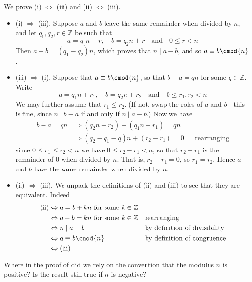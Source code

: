 \begin{cproof}
We prove (i) $\Leftrightarrow$ (iii) and (ii) $\Leftrightarrow$ (iii).
\begin{itemize}
\item (i) $\Rightarrow$ (iii). Suppose $a$ and $b$ leave the same remainder when divided by $n$, and let $q_1,q_2,r \in \mathbb{Z}$ be such that
\[ a=q_1n+r, \quad b = q_2n+r \quad \text{and} \quad 0 \le r < n \]
Then $a-b = (q_1-q_2)n$, which proves that $n \mid a-b$, and so $a \equiv b \cmod{n}$.
\item (iii) $\Rightarrow$ (i). Suppose that $a \equiv b \cmod{n}$, so that $b-a = qn$ for some $q \in \mathbb{Z}$. Write
\[ a=q_1n+r_1, \quad b = q_2n+r_2 \quad \text{and} \quad 0 \le r_1,r_2 < n \]
We may further assume that $r_1 \le r_2$. (If not, swap the roles of $a$ and $b$---this is fine, since $n \mid b-a$ if and only if $n \mid a-b$.) Now we have
\begin{align*}
b-a = qn & \Rightarrow (q_2n+r_2) - (q_1n+r_1) = qn && \\
& \Rightarrow (q_2-q_1-q)n + (r_2-r_1) = 0 && \text{rearranging}
\end{align*}
since $0 \le r_1 \le r_2 < n$ we have $0 \le r_2-r_1 < n$, so that $r_2-r_1$ is the remainder of $0$ when divided by $n$. That is, $r_2-r_1=0$, so $r_1=r_2$. Hence $a$ and $b$ have the same remainder when divided by $n$.
\item (ii) $\Leftrightarrow$ (iii). We unpack the definitions of (ii) and (iii) to see that they are equivalent. Indeed
\begin{align*}
\text{(ii)} &\Leftrightarrow a=b+kn \text{ for some $k \in \mathbb{Z}$} && \\
&\Leftrightarrow a-b=kn \text{ for some $k \in \mathbb{Z}$} && \text{rearranging} \\
&\Leftrightarrow n \mid a-b && \text{by definition of divisibility} \\
&\Leftrightarrow a \equiv b \cmod{n} && \text{by definition of congruence} \\
&\Leftrightarrow \text{(iii)} &&
\end{align*}
\end{itemize}
\end{cproof}

\begin{discussion}
Where in the proof of  did we rely on the convention that the modulus $n$ is positive? Is the result still true if $n$ is negative?
\end{discussion}

